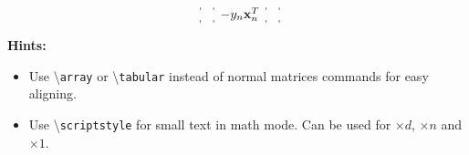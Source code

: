 \documentclass{article}
\begin{document}
\[\begin{array}{rl@{}:cccc:cccc:c:@{}r r@{}c@{}l}
                                                  &                                                                                            & \multicolumn{4}{c:}{}                                         & \multicolumn{4}{c:}{\multirow{1}{*}{$-y_n \mathbf x_n^T$}} & \multicolumn{1}{c:}{}                               &                                                                                            &                                                                                            &                              \\
    \end{array}
\]

\textbf{Hints:}
\begin{itemize}
    \item Use \textbackslash\texttt{array} or \textbackslash\texttt{tabular} instead of normal matrices commands for easy aligning.
    \item Use \textbackslash\texttt{scriptstyle} for small text in math mode. Can be used for $\times d$, $\times n$ and $\times 1$.
\end{itemize}
\end{document}
